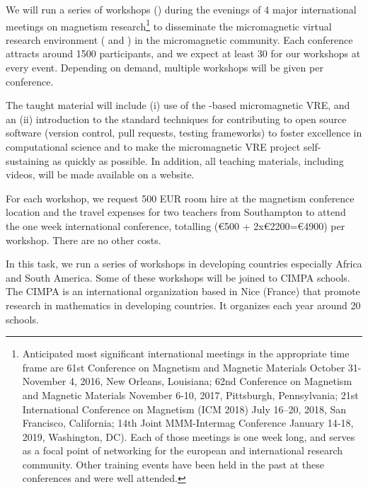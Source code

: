 \begin{workpackage}
\begin{tasklist}
\begin{task}[title=Micromagnetic VRE dissemination workshops,
id=dissemination-of-oommf-nb-workshops,lead=USO,PM=6]
We will run a series of workshops
() during the evenings of 4 major
international meetings on magnetism research\footnote{Anticipated most
  significant international meetings in the appropriate time frame are
  61st Conference on Magnetism and Magnetic Materials October
  31-November 4, 2016, New Orleans, Louisiana; 62nd Conference on
  Magnetism and Magnetic Materials November 6-10, 2017, Pittsburgh,
  Pennsylvania; 21st International Conference on Magnetism (ICM 2018)
  July 16–20, 2018, San Francisco, California; 14th Joint MMM-Intermag
  Conference January 14-18, 2019, Washington, DC). Each of those
  meetings is one week long, and serves as a focal point of networking
  for the european and international research community. Other training events have been held in the
past at these conferences and were well attended.} to
disseminate the micromagnetic virtual research environment
( and
) in the
micromagnetic community. Each conference
attracts around 1500 participants, and we expect at least 30 for our
workshops at every event. Depending on demand, multiple workshops
will be given per conference. 

The taught material will include (i) use of the \Jupyter-based
micromagnetic VRE, and an (ii) introduction to the standard techniques
for contributing to open source software (version control, pull
requests, testing frameworks) to foster excellence in computational
science and to make the micromagnetic VRE project self-sustaining as quickly
as possible. In addition, all teaching materials, including videos,
will be made available on a website.

For each workshop, we request 500 EUR room hire at the magnetism conference
location and the travel expenses for two teachers from Southampton to
attend the one week international conference, totalling (\euro{500} +
2x\euro{2200}=\euro{4900}) per workshop. There are no other costs.
\end{task}

\begin{task}[id=workshop-developing-countries,title=Workshops in developing countries,
PM=6]
In this task, we run a series of workshops in developing countries especially
Africa and South America. Some of these workshops will be joined to CIMPA schools.
The CIMPA is an international organization based in Nice (France) that promote
research in mathematics in developing countries. It organizes each year around
20 schools.


\end{task}
\end{tasklist}
\end{workpackage}
